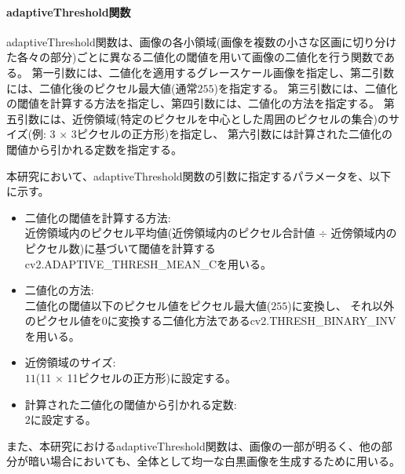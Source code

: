 \paragraph{adaptiveThreshold関数}
adaptiveThreshold関数は、画像の各小領域(画像を複数の小さな区画に切り分けた各々の部分)ごとに異なる二値化の閾値を用いて画像の二値化を行う関数である。
第一引数には、二値化を適用するグレースケール画像を指定し、第二引数には、二値化後のピクセル最大値(通常$255$)を指定する。
第三引数には、二値化の閾値を計算する方法を指定し、第四引数には、二値化の方法を指定する。
第五引数には、近傍領域(特定のピクセルを中心とした周囲のピクセルの集合)のサイズ(例: 3 $\times$ 3ピクセルの正方形)を指定し、
第六引数には計算された二値化の閾値から引かれる定数を指定する。
\par
本研究において、adaptiveThreshold関数の引数に指定するパラメータを、以下に示す。
\begin{itemize}
    \setlength{\itemsep}{0pt}
          \setlength{\parsep}{0pt}
    \item 二値化の閾値を計算する方法:\\
          近傍領域内のピクセル平均値(近傍領域内のピクセル合計値 $\div$ 近傍領域内のピクセル数)に基づいて閾値を計算するcv2.ADAPTIVE\_THRESH\_MEAN\_Cを用いる。
    \item 二値化の方法:\\
          二値化の閾値以下のピクセル値をピクセル最大値($255$)に変換し、
          それ以外のピクセル値を$0$に変換する二値化方法であるcv2.THRESH\_BINARY\_INVを用いる。
    \item 近傍領域のサイズ:\\
          $11$(11 $\times$ 11ピクセルの正方形)に設定する。
    \item 計算された二値化の閾値から引かれる定数:\\
          $2$に設定する。
\end{itemize}
\par
また、本研究におけるadaptiveThreshold関数は、画像の一部が明るく、他の部分が暗い場合においても、全体として均一な白黒画像を生成するために用いる。
\par
